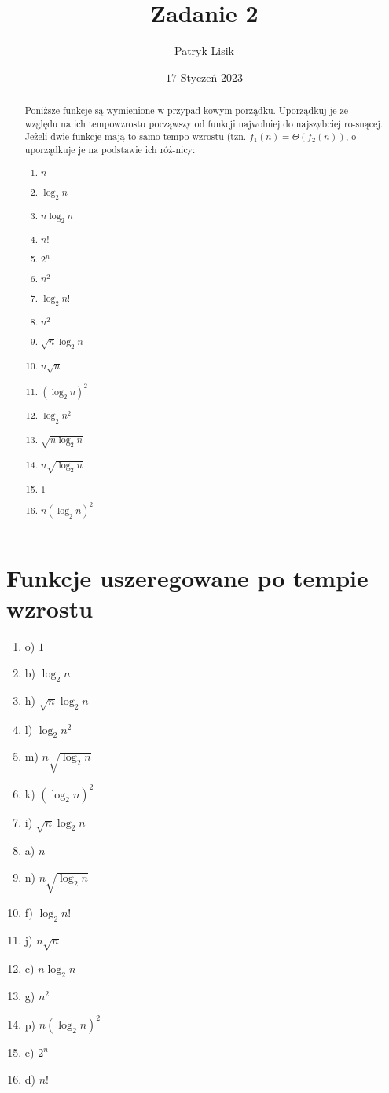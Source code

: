 \documentclass[12pt]{article}
\title{Zadanie 2}
\author{Patryk Lisik}
\date{\(17\) Styczeń  2023}
\begin{document}
\markboth{\theauthor}{\thetitle}

\maketitle


\begin{abstract}
Poniższe funkcje są wymienione w przypad-kowym porządku. Uporządkuj je ze względu na ich tempowzrostu począwszy od funkcji najwolniej do najszybciej ro-snącej. Jeżeli dwie funkcje mają to samo tempo wzrostu (tzn. $f_1(n)=\Theta(f_2(n))$, o uporządkuje je na podstawie ich róż-nicy:
\begin{enumerate}[label=(\alph*)]
    \item $n$
    \item $\log_2n$
    \item $n \log_2n$
    \item $n!$
    \item $2^n$
    \item $n^2$
    \item $\log_2 n!$
    \item $n^2$
    \item $\sqrt{n}\log_2n$
    \item $n\sqrt{n}$
    \item $\left(\log_2n\right)^2$
    \item $\log_2 n^2$
    \item $\sqrt{n\log_2n}$
    \item $n\sqrt{\log_2n}$
    \item $1$
    \item $n(\log_2n)^2$
\end{enumerate}
\end{abstract}


\section{Funkcje uszeregowane po tempie wzrostu}
\begin{enumerate}
    \item o) $1$
    \item b) $\log_2n$
    \item h) $\sqrt{n}\log_2n$
    \item l) $\log_2 n^2$
    \item m) $n\sqrt{\log_2n}$
    \item k) $\left(\log_2n\right)^2$
    \item i) $\sqrt{n}\log_2n$
    \item a) $n$
    \item n) $n\sqrt{\log_2n}$
    \item f) $\log_2 n!$
    \item j) $n\sqrt{n}$
    \item c) $n \log_2n$
    \item g) $n^2$
    \item p) $n(\log_2n)^2$
    \item e) $2^n$
    \item d) $n!$
\end{enumerate}
\end{document}
